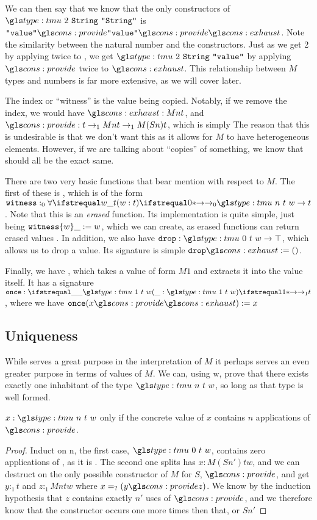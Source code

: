 We can then say that we know that the only constructors of $\tm 2 {\code{String}} \verb|"String"|$ is $\verb|"value"| \ms \verb|"value"| \ms \mz$. Note the similarity between the natural number and the constructors. 
Just as we get 2 by applying twice to , we get $\tm 2 {\code{String}} \verb|"value"|$ by applying $\ms$ twice to $\mz$. 
This relationship between $M$ types and numbers is far more extensive, as we will cover later. 

The index or ``witness'' is the value being copied.
Notably, if we remove the index, we would have $\mz : M n t$, and $\ms : t \to_1 M n t \to_1 M (S n) t$, which is simply 
The reason that this is undesirable is that we don't want this as it allows for $M$ to have heterogeneous elements. 
However, if we are talking about ``copies'' of something, we know that should all be the exact same.

There are two very basic functions that bear mention with respect to $M$. The first of these is , which is of the form $\code{witness}:_0 \oldfa0 w : t . \tm n t w \to t$.
Note that this is an \emph{erased} function.
Its implementation is quite simple, just being ${\mathtt{witness}}\{w\} \_ := w$, which we can create, as erased functions can return erased values \needcite.
In addition, we also have $\code{drop}: \fn{{\tm 0 t w}}{\top}$, which allows us to drop a value.
Its signature is simple $\code{drop}\mz \deq ()$.

Finally, we have , which takes a value of form $M 1$ and extracts it into the value itself.
It has a signature $\code{once}: \oldfn1 \_ : \tm 1 t w . t$, where we have $\code{once}(x \ms \mz) \deq x$

\subsection{Uniqueness}

While serves a great purpose in the interpretation of $M$ it perhaps serves an even greater purpose in terms of values of $M$.
We can, using \sigil w, prove that there exists exactly one inhabitant of the type $\tm n t w$, so long as that type is well formed.


\begin{lemma}
	$x : \tm n t w$ only if the concrete value of $x$ contains $n$ applications of $\ms$.
\end{lemma}
\begin{proof}
	Induct on \sigil n, the first case, $\tm 0 t w$, contains zero applications of \ms, as it is \mz.
	The second one splits has $x : M (S n') t w$, and we can destruct on the only possible constructor of $M$ for $S$, $\ms$, and get $y :_1 t$ and $z :_1 M n t w$ where $x \peq (y \ms z)$. 
	We know by the induction hypothesis that $z$ contains exactly $n'$ uses of $\ms$, and we therefore know that the constructor occurs one more times then that, or $S n'$
\end{proof}

